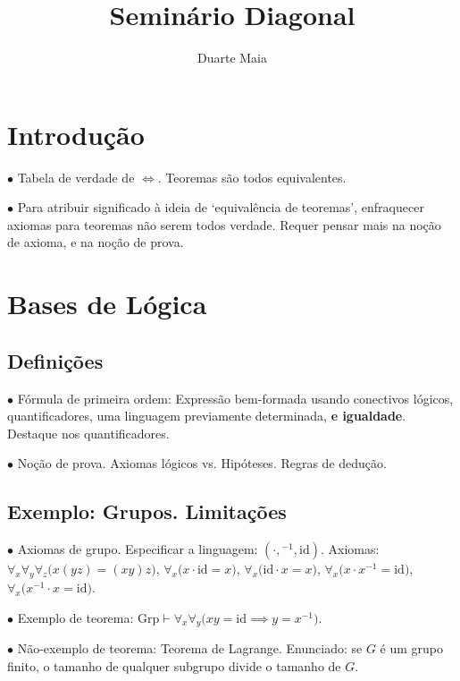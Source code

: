 \documentclass{article}
\title{Seminário Diagonal}
\author{Duarte Maia}
\theoremstyle{nonumberplain}
\newcommand{\Grp}{\mathrm{Grp}}
\newcommand{\id}{\mathrm{id}}
\newcommand\point[1]{\noindent \hspace{\labelsep} $\bullet$ #1 \smallskip}
\newcommand\timestamp[1]{}
\begin{document}
\maketitle

\section{Introdução}

\point{Tabela de verdade de $\Leftrightarrow$. Teoremas são todos equivalentes.}

\point{Para atribuir significado à ideia de `equivalência de teoremas', enfraquecer axiomas para teoremas não serem todos verdade. Requer pensar mais na noção de axioma, e na noção de prova.}

\timestamp{2 min}

\section{Bases de Lógica}

\subsection{Definições}

\point{Fórmula de primeira ordem: Expressão bem-formada usando conectivos lógicos, quantificadores, uma linguagem previamente determinada, \textbf{e igualdade}. Destaque nos quantificadores.}

\point{Noção de prova. Axiomas lógicos vs. Hipóteses. Regras de dedução.}

\timestamp{7 min}

\subsection{Exemplo: Grupos. Limitações}

\point{Axiomas de grupo. Especificar a linguagem: $( \cdot, {}^{-1}, \id)$. Axiomas: $\forall_x \forall_y \forall_z \big(x(yz) = (xy)z\big)$, $\forall_x \big(x \cdot \id = x\big)$, $\forall_x \big(\id \cdot x = x\big)$, $\forall_x \big(x \cdot x^{-1} = \id\big)$, $\forall_x \big(x^{-1} \cdot x = \id\big)$.}

\point{Exemplo de teorema: $\Grp \vdash \forall_x \forall_y \big( xy = \id \implies y = x^{-1}\big)$.}

\point{Não-exemplo de teorema: Teorema de Lagrange. Enunciado: se $G$ é um grupo finito, o tamanho de qualquer subgrupo divide o tamanho de $G$.}
\end{document}
